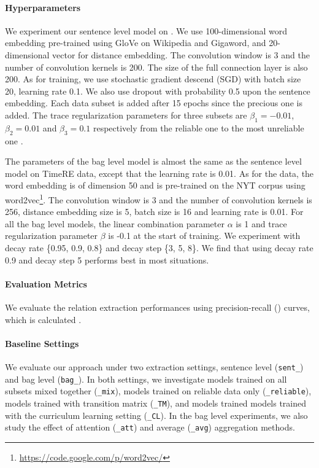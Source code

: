 \paragraph{Hyperparameters}  
We experiment our sentence level model on \TimeRE. We use 100-dimensional word embedding pre-trained using GloVe \cite{pennington2014glove} on Wikipedia and Gigaword, and 20-dimensional vector for distance embedding. The convolution window is 3 and the number of convolution kernels is 200. The size of the full connection layer is also 200. As for training, we use stochastic gradient descend (SGD) with batch size 20, learning rate 0.1. We also use dropout with probability 0.5 upon the sentence embedding. Each data subset is added after 15 epochs since the precious one is added. The trace regularization parameters for three subsets are $\beta_1=-0.01$, $\beta_2=0.01$ and $\beta_3=0.1$ respectively from the reliable one to the most unreliable one .


The parameters of the bag level model is almost the same as the sentence level model on TimeRE data, except that the learning rate is 0.01. As for the \EntityRE data, the word embedding is of dimension 50 and is pre-trained on the NYT corpus using word2vec\footnote{\url{ https://code.google.com/p/word2vec/}}. The convolution window is 3 and the number of convolution kernels is 256, distance embedding size is 5, batch size is 16 and learning rate is 0.01. For all the bag level models, the linear combination parameter $\alpha$ is 1 and trace regularization parameter $\beta$ is -0.1 at the start of training. We experiment with decay rate \{0.95, 0.9, 0.8\} and decay step \{3, 5, 8\}. We find that using decay rate 0.9 and decay step 5 performs best in most situations.

\paragraph{Evaluation Metrics}
We evaluate the relation extraction performances using precision-recall (\PR) curves, which is calculated .

\paragraph{Baseline Settings}
We evaluate our approach under two extraction settings, sentence level
(\texttt{sent\_}) and bag level (\texttt{bag\_}). In both settings, we
investigate models trained on all subsets mixed together (\texttt{\_mix}),
models trained on reliable data only (\texttt{\_reliable}), models trained
with transition matrix (\texttt{\_TM}), and models trained models trained
with the curriculum learning setting  (\texttt{\_CL}). In the bag level
experiments, we also study the effect of attention (\texttt{\_att}) and
average
(\texttt{\_avg}) aggregation methods. 

